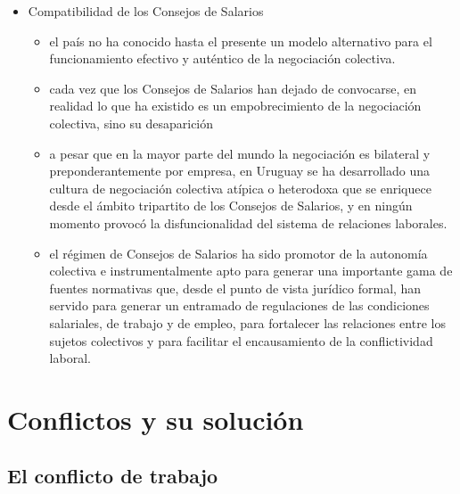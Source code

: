 \documentclass[spanish,12pt,a4paper,titlepage]{report}
\begin{document}
\begin{enumerate}
\begin{itemize}
\item Compatibilidad de los Consejos de Salarios
\begin{itemize}
\item el país no ha conocido hasta el presente un modelo alternativo para el funcionamiento efectivo y auténtico de la negociación colectiva. 
\item cada vez que los Consejos de Salarios han dejado de convocarse, en realidad lo que ha existido es un empobrecimiento de la negociación colectiva, sino su desaparición
\item a pesar que en la mayor parte del mundo la negociación es bilateral y preponderantemente por empresa, en Uruguay se ha desarrollado una cultura de negociación colectiva atípica o heterodoxa que se enriquece desde el ámbito tripartito de los Consejos de Salarios, y en ningún momento provocó la disfuncionalidad del sistema de relaciones laborales. 

\item el régimen de Consejos de Salarios ha sido promotor de la autonomía colectiva e instrumentalmente apto para generar una importante gama de fuentes normativas que, desde el punto de vista jurídico formal, han servido para generar un entramado de regulaciones de las condiciones salariales, de trabajo y de empleo, para fortalecer las relaciones entre los sujetos colectivos y para facilitar el encausamiento de la conflictividad laboral. 

\end{itemize}
\end{itemize}
\end{enumerate}

\chapter{Conflictos y su solución}

\section{El conflicto de trabajo}
\end{document}
